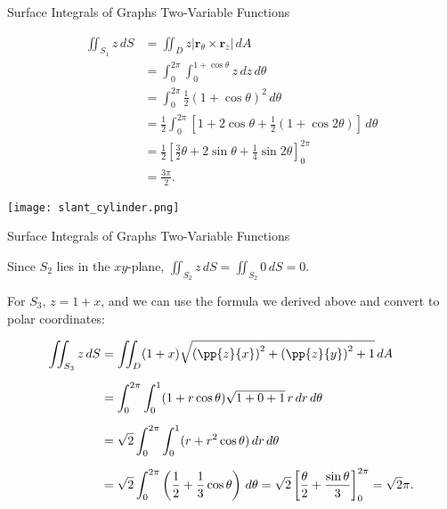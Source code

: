 \documentclass[11pt,english,
handout
]{beamer}
\begin{document}
\begin{frame}[t]{Surface Integrals of Graphs Two-Variable Functions}
\small
\begin{example}

\vspace{3mm}
\begin{minipage}{0.5\textwidth}
\footnotesize
\begin{align*}
\iint_{S_1}z\,dS&=\iint_Dz|\mathbf{r}_\theta\times\mathbf{r}_z|\,dA\\[2mm]
&=\int_0^{2\pi}\int_0^{1+\cos\theta}z\,dz\,d\theta\\[2mm]
&=\int_0^{2\pi}\frac{1}{2}(1+\cos\theta)^2\,d\theta\\[2mm]
&=\frac{1}{2}\int_0^{2\pi}\left[1+2\cos\theta+\frac{1}{2}(1+\cos2\theta)\right]\,d\theta\\[2mm]
&=\frac{1}{2}\left[\frac{3}{2}\theta+2\sin\theta+\frac{1}{4}\sin2\theta\right]_0^{2\pi}\\[2mm]
&=\frac{3\pi}{2}.
\end{align*}
\end{minipage}%
\begin{minipage}{0.5\textwidth}
\begin{center}
\texttt{[image: slant\_cylinder.png]}
\end{center}
\end{minipage}
\end{example}
\end{frame}
















\begin{frame}[t]{Surface Integrals of Graphs Two-Variable Functions}
\small
\begin{example}

Since $S_2$ lies in the $xy$-plane, $\displaystyle \iint_{S_2}z\,dS=\iint_{S_2}0\,dS=0$.\pause

\lspace
For $S_3$, $z=1+x$, and we can use the formula we derived above and convert to polar coordinates:

{\scriptsize
\begin{align*}
\iint_{S_3}z\,dS&=\iint_D(1+x)\sqrt{\left(\pp{z}{x}\right)^2+\left(\pp{z}{y}\right)^2+1}\,dA\\[2mm]
&=\int_0^{2\pi}\int_0^1(1+r\cos\theta)\sqrt{1+0+1}\,r\,dr\,d\theta\\[2mm]
&=\sqrt{2}\int_0^{2\pi}\int_0^1(r+r^2\cos\theta)\,dr\,d\theta\\[2mm]
&=\sqrt{2}\int_0^{2\pi}\left(\frac{1}{2}+\frac{1}{3}\cos\theta\right)\,d\theta=\sqrt{2}\left[\frac{\theta}{2}+\frac{\sin\theta}{3}\right]_0^{2\pi}=\sqrt{2}\pi.
\end{align*}}
\end{example}
\end{frame}
\end{document}
